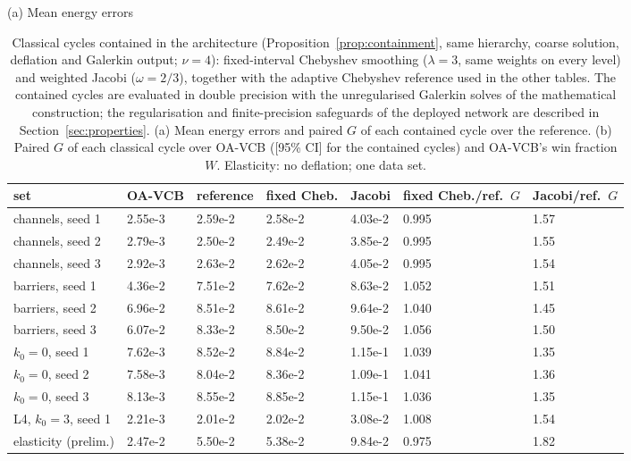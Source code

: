 \begin{table}[tbp]\centering\footnotesize\setlength{\tabcolsep}{4pt}
\caption{Classical cycles contained in the architecture (Proposition~\ref{prop:containment}, same hierarchy, coarse solution, deflation and Galerkin output; $\nu=4$): fixed-interval Chebyshev smoothing ($\lambda=3$, same weights on every level) and weighted Jacobi ($\omega=2/3$), together with the adaptive Chebyshev reference used in the other tables. The contained cycles are evaluated in double precision with the unregularised Galerkin solves of the mathematical construction; the regularisation and finite-precision safeguards of the deployed network are described in Section~\ref{sec:properties}. (a) Mean energy errors and paired $G$ of each contained cycle over the reference. (b) Paired $G$ of each classical cycle over OA-VCB ([95\% CI] for the contained cycles) and OA-VCB's win fraction $W$. Elasticity: no deflation; one data set.}\label{tab:contained}
{\small (a) Mean energy errors}\par\smallskip
\begin{adjustbox}{max width=\linewidth}
\begin{tabular}{lllllll}\toprule
set & OA-VCB & reference & fixed Cheb. & Jacobi & fixed Cheb./ref.\ $G$ & Jacobi/ref.\ $G$ \\\midrule
channels, seed 1 & 2.55e-3 & 2.59e-2 & 2.58e-2 & 4.03e-2 & 0.995 & 1.57 \\
channels, seed 2 & 2.79e-3 & 2.50e-2 & 2.49e-2 & 3.85e-2 & 0.995 & 1.55 \\
channels, seed 3 & 2.92e-3 & 2.63e-2 & 2.62e-2 & 4.05e-2 & 0.995 & 1.54 \\
barriers, seed 1 & 4.36e-2 & 7.51e-2 & 7.62e-2 & 8.63e-2 & 1.052 & 1.51 \\
barriers, seed 2 & 6.96e-2 & 8.51e-2 & 8.61e-2 & 9.64e-2 & 1.040 & 1.45 \\
barriers, seed 3 & 6.07e-2 & 8.33e-2 & 8.50e-2 & 9.50e-2 & 1.056 & 1.50 \\
$k_0=0$, seed 1 & 7.62e-3 & 8.52e-2 & 8.84e-2 & 1.15e-1 & 1.039 & 1.35 \\
$k_0=0$, seed 2 & 7.58e-3 & 8.04e-2 & 8.36e-2 & 1.09e-1 & 1.041 & 1.36 \\
$k_0=0$, seed 3 & 8.13e-3 & 8.55e-2 & 8.85e-2 & 1.15e-1 & 1.036 & 1.35 \\
L4, $k_0=3$, seed 1 & 2.21e-3 & 2.01e-2 & 2.02e-2 & 3.08e-2 & 1.008 & 1.54 \\
elasticity (prelim.) & 2.47e-2 & 5.50e-2 & 5.38e-2 & 9.84e-2 & 0.975 & 1.82 \\

\end{tabular}
\end{adjustbox}
\end{table}
